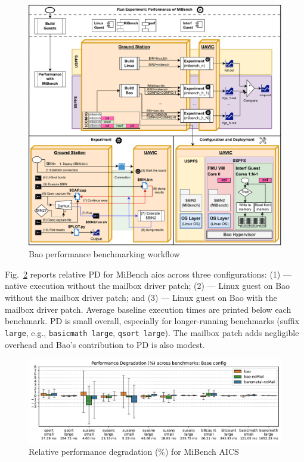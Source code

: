\begin{figure}[!hbt]
  \centering
  \includegraphics[width=1.0\textwidth]{./img/pdf/uav-main-eval-mibench}
  \caption{Bao performance benchmarking workflow}%
  \label{fig:uav-main-eval-mibench}
\end{figure}

Fig.~\ref{fig:plot-performDeg-Base} reports relative PD for MiBench \gls{aics} across three configurations:
(1)  — native execution without the mailbox driver patch;
(2)  — Linux guest on Bao without the mailbox driver patch; and
(3)  — Linux guest on Bao with the mailbox driver patch.
Average baseline execution times are printed below each benchmark. PD is small
overall, especially for longer-running benchmarks (suffix \lstinline{large},
e.g., \lstinline{basicmath large}, \lstinline{qsort large}). The mailbox patch
adds negligible overhead and Bao's contribution to PD is also modest.

\begin{figure}[!hbt]
  \centering
  \includegraphics[width=1.0\textwidth]{./img/pdf/plot-performDeg-Base}
  \caption{Relative performance degradation (\%) for MiBench AICS}%
  \label{fig:plot-performDeg-Base}
\end{figure}

